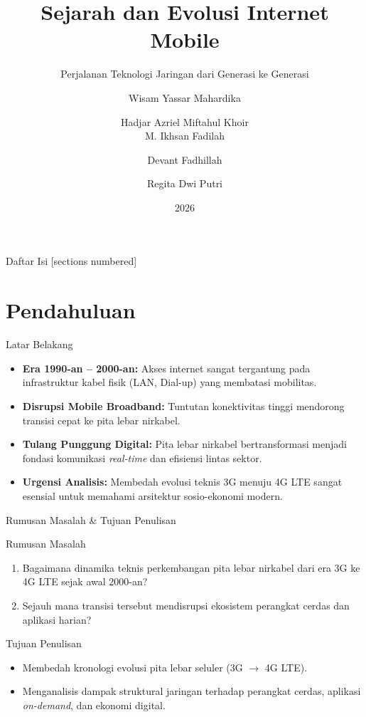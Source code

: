 \documentclass[10pt,aspectratio=169]{beamer}
\title{Sejarah dan Evolusi Internet Mobile}
\subtitle{Perjalanan Teknologi Jaringan dari Generasi ke Generasi}
\author{
  Wisam Yassar Mahardika \and Hadjar Azriel Miftahul Khoir \\
  M. Ikhsan Fadilah \and Devant Fadhillah \and Regita Dwi Putri
}
\institute{SMK PLUS PRATAMA ADI --- KOTA BANDUNG}
\date{2026}
\begin{document}
\begin{frame}
  \titlepage
\end{frame}

\begin{frame}{Daftar Isi}
  [sections numbered]
  \tableofcontents[hideallsubsections]
\end{frame}

\section{Pendahuluan}

\begin{frame}{Latar Belakang}
  \begin{itemize}
    \item \textbf{Era 1990-an -- 2000-an:} Akses internet sangat tergantung pada infrastruktur kabel fisik (LAN, Dial-up) yang membatasi mobilitas.
    \item \textbf{Disrupsi Mobile Broadband:} Tuntutan konektivitas tinggi mendorong transisi cepat ke pita lebar nirkabel.
    \item \textbf{Tulang Punggung Digital:} Pita lebar nirkabel bertransformasi menjadi fondasi komunikasi \textit{real-time} dan efisiensi lintas sektor.
    \item \textbf{Urgensi Analisis:} Membedah evolusi teknis 3G menuju 4G LTE sangat esensial untuk memahami arsitektur sosio-ekonomi modern.
  \end{itemize}
\end{frame}

\begin{frame}{Rumusan Masalah \& Tujuan Penulisan}
  \begin{block}{Rumusan Masalah}
    \begin{enumerate}
      \item Bagaimana dinamika teknis perkembangan pita lebar nirkabel dari era 3G ke 4G LTE sejak awal 2000-an?
      \item Sejauh mana transisi tersebut mendisrupsi ekosistem perangkat cerdas dan aplikasi harian?
    \end{enumerate}
  \end{block}

  \begin{block}{Tujuan Penulisan}
    \begin{itemize}
      \item Membedah kronologi evolusi pita lebar seluler (3G $\rightarrow$ 4G LTE).
      \item Menganalisis dampak struktural jaringan terhadap perangkat cerdas, aplikasi \textit{on-demand}, dan ekonomi digital.
    \end{itemize}
  \end{block}
\end{frame}
\end{document}
